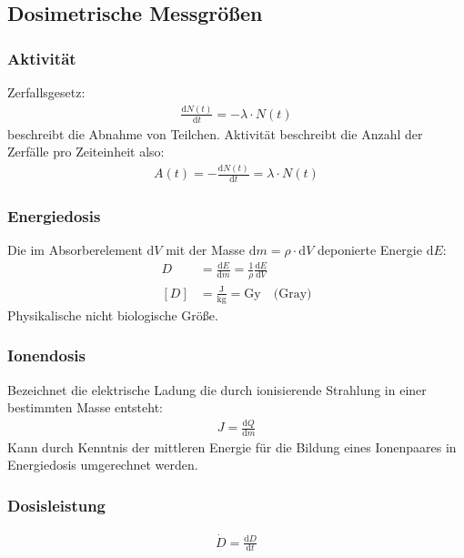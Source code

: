 \documentclass[11pt, a4paper]{article}
\numberwithin{equation}{section}
\begin{document}
\subsection{Dosimetrische Messgrößen}

\subsubsection{Aktivität}
Zerfallsgesetz:
\begin{align}
	\frac{\mathrm{d} N(t)}{\mathrm{d} t} = - \lambda \cdot N(t)
\end{align}
beschreibt die Abnahme von Teilchen.
Aktivität beschreibt die Anzahl der Zerfälle pro Zeiteinheit also:
\begin{align}
	A(t) = - \frac{\mathrm{d} N(t)}{\mathrm{d} t} = \lambda \cdot N(t)
\end{align}

\subsubsection{Energiedosis}
Die im Absorberelement $\mathrm{d}V$ mit der Masse $\mathrm{d} m = \rho \cdot \mathrm{d}V$ deponierte Energie $\mathrm{d}E$:
\begin{align}
	D &= \frac{\mathrm{d}E}{\mathrm{d}m} = \frac{1}{\rho}\frac{\mathrm{d}E}{\mathrm{d}V}\\
	[D] &= \frac{\mathrm{J}}{\mathrm{kg}} = \mathrm{Gy} \quad \text{(Gray)}
\end{align}
Physikalische nicht biologische Größe.

\subsubsection{Ionendosis}
\label{sec:ionendosis}
Bezeichnet die elektrische Ladung die durch ionisierende Strahlung in einer bestimmten Masse entsteht:
\begin{align}
	J = \frac{\mathrm{d}Q}{\mathrm{d}m}
\end{align}
Kann durch Kenntnis der mittleren Energie für die Bildung eines Ionenpaares in Energiedosis umgerechnet werden.

\subsubsection{Dosisleistung}
\begin{align}
	\dot{D} = \frac{\mathrm{d}D}{\mathrm{d}t}
\end{align}
\end{document}
